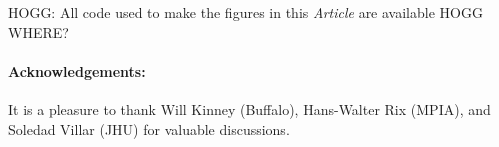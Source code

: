 \documentclass[letterpaper]{article}
\newcommand{\documentname}{\textsl{Article}}
\begin{document}
HOGG: All code used to make the figures in this \documentname{} are available HOGG WHERE?

\paragraph{Acknowledgements:}
It is a pleasure to thank Will Kinney (Buffalo), Hans-Walter Rix (MPIA), and Soledad Villar (JHU) for valuable discussions.

\footnotesize


\end{document}
